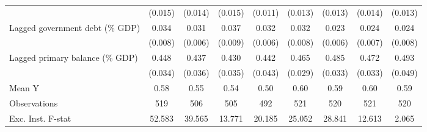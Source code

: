{\begin{tabular}{l*{8}{c}}
                    &     (0.015)         &     (0.014)         &     (0.015)         &     (0.011)         &     (0.013)         &     (0.013)         &     (0.014)         &     (0.013)         \\
\addlinespace
Lagged government debt (\% GDP)&       0.034\sym{***}&       0.031\sym{***}&       0.037\sym{***}&       0.032\sym{***}&       0.032\sym{***}&       0.023\sym{***}&       0.024\sym{***}&       0.024\sym{***}\\
                    &     (0.008)         &     (0.006)         &     (0.009)         &     (0.006)         &     (0.008)         &     (0.006)         &     (0.007)         &     (0.008)         \\
\addlinespace
Lagged primary balance (\% GDP)&       0.448\sym{***}&       0.437\sym{***}&       0.430\sym{***}&       0.442\sym{***}&       0.465\sym{***}&       0.485\sym{***}&       0.472\sym{***}&       0.493\sym{***}\\
                    &     (0.034)         &     (0.036)         &     (0.035)         &     (0.043)         &     (0.029)         &     (0.033)         &     (0.033)         &     (0.049)         \\
\midrule
Mean Y              &        0.58         &        0.55         &        0.54         &        0.50         &        0.60         &        0.59         &        0.60         &        0.59         \\
Observations        &         519         &         506         &         505         &         492         &         521         &         520         &         521         &         520         \\
Exc. Inst. F-stat   &      52.583         &      39.565         &      13.771         &      20.185         &      25.052         &      28.841         &      12.613         &       2.065         \\
\bottomrule
\end{tabular}
}
